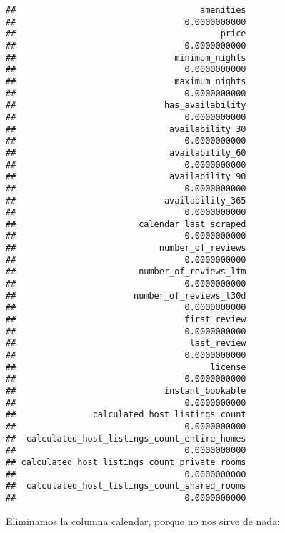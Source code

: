 \documentclass[
]{article}
\newenvironment{Shaded}{\begin{snugshade}}{\end{snugshade}}
\newcommand{\ConstantTok}[1]{\textcolor[rgb]{0.00,0.00,0.00}{#1}}
\newcommand{\DocumentationTok}[1]{\textcolor[rgb]{0.56,0.35,0.01}{\textbf{\textit{#1}}}}
\newcommand{\NormalTok}[1]{#1}
\newcommand{\OtherTok}[1]{\textcolor[rgb]{0.56,0.35,0.01}{#1}}
\newcommand{\SpecialCharTok}[1]{\textcolor[rgb]{0.00,0.00,0.00}{#1}}
\begin{document}
\begin{verbatim}
##                                    amenities 
##                                 0.0000000000 
##                                        price 
##                                 0.0000000000 
##                               minimum_nights 
##                                 0.0000000000 
##                               maximum_nights 
##                                 0.0000000000 
##                             has_availability 
##                                 0.0000000000 
##                              availability_30 
##                                 0.0000000000 
##                              availability_60 
##                                 0.0000000000 
##                              availability_90 
##                                 0.0000000000 
##                             availability_365 
##                                 0.0000000000 
##                        calendar_last_scraped 
##                                 0.0000000000 
##                            number_of_reviews 
##                                 0.0000000000 
##                        number_of_reviews_ltm 
##                                 0.0000000000 
##                       number_of_reviews_l30d 
##                                 0.0000000000 
##                                 first_review 
##                                 0.0000000000 
##                                  last_review 
##                                 0.0000000000 
##                                      license 
##                                 0.0000000000 
##                             instant_bookable 
##                                 0.0000000000 
##               calculated_host_listings_count 
##                                 0.0000000000 
##  calculated_host_listings_count_entire_homes 
##                                 0.0000000000 
## calculated_host_listings_count_private_rooms 
##                                 0.0000000000 
##  calculated_host_listings_count_shared_rooms 
##                                 0.0000000000
\end{verbatim}

Eliminamos la columna calendar, porque no nos sirve de nada:

\begin{Shaded}
\end{Shaded}
\end{document}
